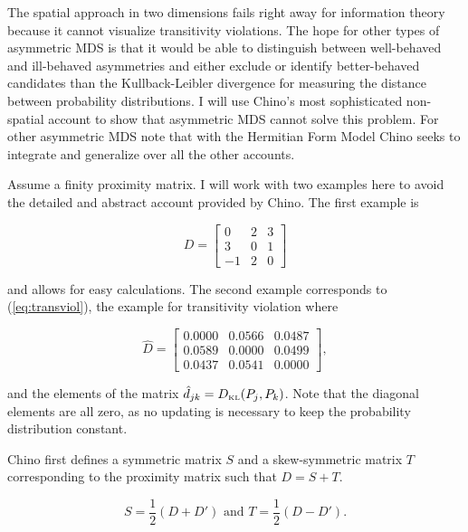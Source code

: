 \documentclass[phd,12pt,oneside]{ubcthesis}
\begin{document}
The spatial approach in two dimensions fails right away for
information theory because it cannot visualize transitivity
violations. The hope for other types of asymmetric MDS is that it
would be able to distinguish between well-behaved and ill-behaved
asymmetries and either exclude or identify better-behaved candidates
than the Kullback-Leibler divergence for measuring the distance
between probability distributions. I will use Chino's most
sophisticated non-spatial account to show that asymmetric MDS cannot
solve this problem. For other asymmetric MDS note that with the
Hermitian Form Model Chino seeks to integrate and generalize over all
the other accounts. 

Assume a finity proximity matrix. I will work with two examples here
to avoid the detailed and abstract account provided by Chino. The
first example is

\begin{equation}
  \label{eq:simpromat}
D=\left[
      \begin{array}{ccc}
        0 & 2 & 3 \\
        3 & 0 & 1 \\
        -1 & 2 & 0 
      \end{array}
\right]
\end{equation}

{\noindent}and allows for easy calculations. The second example corresponds to
(\ref{eq:transviol}), the example for transitivity violation where

\begin{equation}
  \label{eq:dklpromat}
\hat{D}=\left[
      \begin{array}{ccc}
0.0000 &  0.0566 &  0.0487 \\
0.0589 &  0.0000 &  0.0499 \\
0.0437 &  0.0541 &  0.0000
      \end{array}
\right],
\end{equation}

{\noindent}and the elements of the matrix $\hat{d}_{jk}=D_{\mbox{\tiny KL}}(P_{j},P_{k})$.
Note that the diagonal elements are all zero, as no updating is
necessary to keep the probability distribution constant.

Chino first defines a symmetric matrix $S$ and a skew-symmetric matrix
$T$ corresponding to the proximity matrix such that $D=S+T$.

\begin{equation}
  \label{eq:skewsym}
  S=\frac{1}{2}(D+D')\mbox{ and }T=\frac{1}{2}(D-D').
\end{equation}
\end{document}
